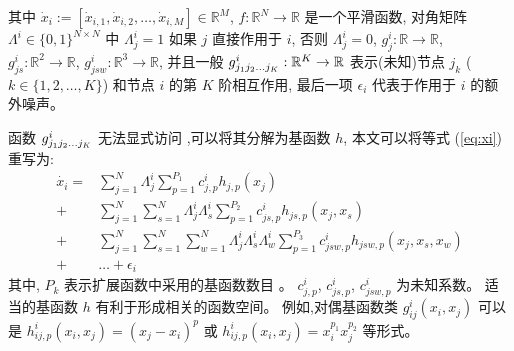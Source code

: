 其中 $\dot{x}_i :=[\dot{x}_{i,1}, \dot{x}_{i,2},\ldots,\dot{x}_{i,M}]\in \mathbb{R}^M$,
$f:\mathbb{R}^N \to \mathbb{R}$ 是一个平滑函数, 
对角矩阵 $\Lambda^i \in \{0,1\}^{N \times N}$ 中 $\Lambda^i_{j}=1$ 如果 $j$ 直接作用于 $i$, 
否则 $\Lambda^i_{j}=0$, $g^i_j:\mathbb{R} \to \mathbb{R}$, $g^i_{js}:\mathbb{R}^2 \to \mathbb{R}$, $g^i_{jsw}:\mathbb{R}^3 \to \mathbb{R}$,
并且一般 $g^i_{j_{1}j_{2}\ldots\\j_{K}}:\mathbb{R}^K \to \mathbb{R}$ 表示(未知)节点 $j_k$ ($k \in \{1,2,\ldots,K\}$) 和节点 $i$ 的第 $K$ 阶相互作用, 
最后一项 $\epsilon_{i}$ 代表于作用于 $i$ 的额外噪声。

函数 $g^i_{j_{1}j_{2}\ldots\\j_{K}}$ 无法显式访问 ,可以将其分解为基函数 $h$,
本文可以将等式 (\ref{eq:xi}) 重写为:
\begin{equation}
\label{eq:xi_with_h}
\begin{split}
\dot{x_i} =  &\sum_{j=1}^{N} \Lambda^i_{j} \sum_{p=1}^{P_1} c^i_{j,p}h_{j,p}(x_j) \\
+ &  \sum_{j=1}^{N} \sum_{s=1}^{N}\Lambda^i_{j}\Lambda^i_{s} \sum_{p=1}^{P_2} c^i_{js,p}h_{js,p}(x_j,x_s) \\
                             + &\sum_{j=1}^{N} \sum_{s=1}^{N} \sum_{w=1}^{N}\Lambda^i_{j}\Lambda^i_{s}\Lambda^i_{w} \sum_{p=1}^{P_3} c^i_{jsw,p}h_{jsw,p}(x_j,x_s,x_w)\\
                             + &\ldots + \epsilon_{i} 
\end{split}
\end{equation}
其中, $P_k$ 表示扩展函数中采用的基函数数目 。
$c^i_{j,p}$, $c^i_{js,p}$, $c^i_{jsw,p}$ 为未知系数。
适当的基函数 $h$ 有利于形成相关的函数空间。
例如,对偶基函数类 $g^i_{ij}(x_i,x_j)$ 可以是 $h^i_{ij,p}(x_i,x_j)=(x_j-x_i)^p$ 或 $h^i_{ij,p}(x_i,x_j)=x^{p_{1}}_i x^{p_{2}}_j$ 等形式。

